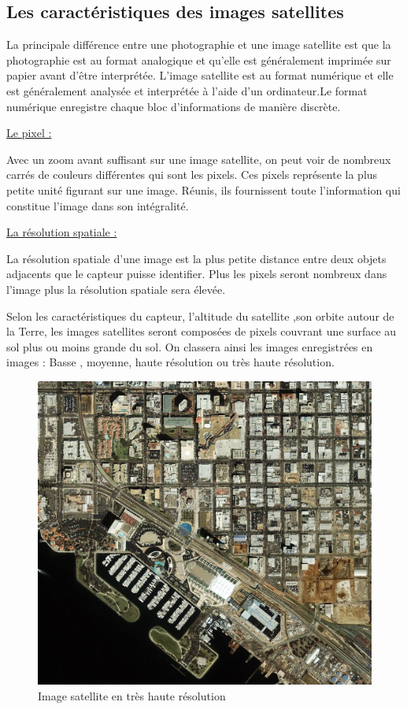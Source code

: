 \documentclass[12pt, openany]{report}
\begin{document}
\subsection{Les caractéristiques des images satellites}
La principale différence entre une photographie et une image satellite est que la photographie est au format analogique et qu’elle est généralement imprimée sur papier avant d’être interprétée. L’image satellite est au format numérique et elle est généralement analysée et interprétée à l’aide d’un ordinateur.Le format numérique enregistre chaque bloc d’informations de manière discrète.


\par
\underline{Le pixel :}
\par

Avec un zoom avant suffisant sur une image satellite, on peut voir de nombreux carrés de couleurs différentes qui sont les pixels.
Ces pixels représente la plus petite unité figurant sur une image. Réunis, ils fournissent toute l’information qui constitue l’image dans son intégralité.

\par
\underline{La résolution spatiale :}
\par 

La résolution spatiale d’une image est la plus petite distance entre deux objets adjacents que le capteur puisse identifier.
Plus les pixels seront nombreux dans l’image plus la résolution spatiale sera élevée.
\par
Selon les caractéristiques du capteur, l’altitude du satellite ,son orbite autour de la Terre, les images satellites seront composées de pixels couvrant une surface au sol plus ou moins grande du sol. On classera ainsi les images enregistrées en images : Basse , moyenne, haute résolution ou très haute résolution.

\begin{figure}[h]
\centering
\includegraphics[scale=0.25]{resolution_image.jpg}
\caption{Image satellite en très haute résolution}
\end{figure}
\end{document}
